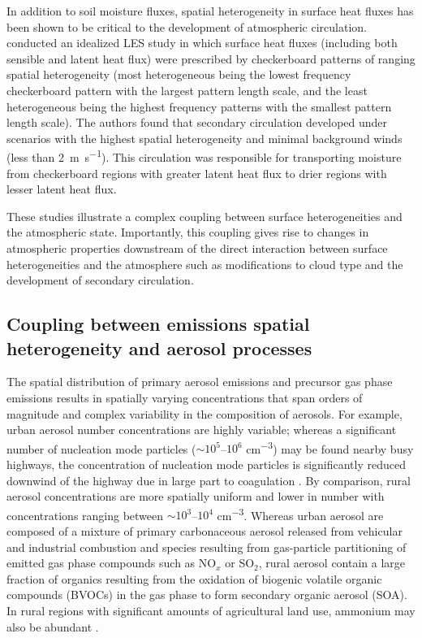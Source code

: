 In addition to soil moisture fluxes, spatial heterogeneity in surface heat fluxes has been shown to be critical to the development of atmospheric circulation. \textcite{lee_effect_2019} conducted an idealized LES study in which surface heat fluxes (including both sensible and latent heat flux) were prescribed by checkerboard patterns of ranging spatial heterogeneity (most heterogeneous being the lowest frequency checkerboard pattern with the largest pattern length scale, and the least heterogeneous being the highest frequency patterns with the smallest pattern length scale). The authors found that secondary circulation developed under scenarios with the highest spatial heterogeneity and minimal background winds (less than 2~\si{m.s^{-1}}). This circulation was responsible for transporting moisture from checkerboard regions with greater latent heat flux to drier regions with lesser latent heat flux. 

These studies illustrate a complex coupling between surface heterogeneities and the atmospheric state. Importantly, this coupling gives rise to changes in atmospheric properties downstream of the direct interaction between surface heterogeneities and the atmosphere such as modifications to cloud type and the development of secondary circulation.   

\subsection{Coupling between emissions spatial heterogeneity and aerosol processes}\label{couple-emiss-sh-aerosol-process}

The spatial distribution of primary aerosol emissions and precursor gas phase emissions results in spatially varying concentrations that span orders of magnitude and complex variability in the composition of aerosols. For example, urban aerosol number concentrations are highly variable; whereas a significant number of nucleation mode particles ($\sim10^5$--$10^6$ \si{cm^{-3}}) may be found nearby busy highways, the concentration of nucleation mode particles is significantly reduced downwind of the highway due in large part to coagulation \parencite{zhu_study_2002}. By comparison, rural aerosol concentrations are more spatially uniform and lower in number with concentrations ranging between $\sim10^3$--$10^4$ \si{cm^{-3}}. Whereas urban aerosol are composed of a mixture of primary carbonaceous aerosol released from vehicular and industrial combustion and species resulting from gas-particle partitioning of emitted gas phase compounds such as NO$_x$ or SO$_2$, rural aerosol contain a large fraction of organics resulting from the oxidation of biogenic volatile organic compounds (BVOCs) in the gas phase to form secondary organic aerosol (SOA). In rural regions with significant amounts of agricultural land use, ammonium may also be abundant \parencite{seinfeld_atmospheric_1998}. 

